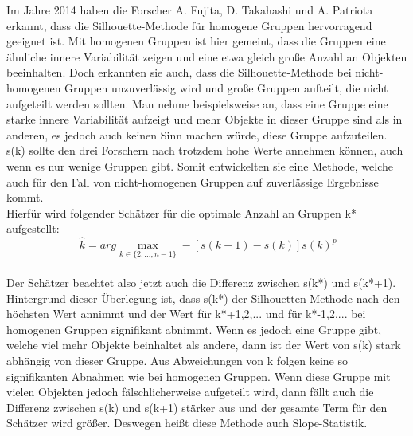 \documentclass[12pt,titlepage]{article}
\begin{document}
Im Jahre 2014 haben die Forscher A. Fujita, D. Takahashi und A. Patriota  \cite{FUJITA201427} erkannt, dass die Silhouette-Methode für homogene Gruppen hervorragend geeignet ist. Mit homogenen Gruppen ist hier gemeint, dass die Gruppen eine ähnliche innere Variabilität zeigen und eine etwa gleich große Anzahl an Objekten beeinhalten. Doch erkannten sie auch, dass die Silhouette-Methode bei nicht-homogenen Gruppen unzuverlässig wird und große Gruppen aufteilt, die nicht aufgeteilt werden sollten. Man nehme beispielsweise an, dass eine Gruppe eine starke innere Variabilität aufzeigt und mehr Objekte in dieser Gruppe sind als in anderen, es jedoch auch keinen Sinn machen würde, diese Gruppe aufzuteilen. s(k) sollte den drei Forschern nach trotzdem hohe Werte annehmen können, auch wenn es nur wenige Gruppen gibt. Somit entwickelten sie eine Methode, welche auch für den Fall von nicht-homogenen Gruppen auf zuverlässige Ergebnisse kommt.\\
Hierfür wird folgender Schätzer für die optimale Anzahl an Gruppen k* aufgestellt:
\begin{equation}
 \ \hat{k}=arg \max_{k\in \{ 2,...,n-1\} } -[s(k+1)-s(k)]s(k)^p
\end{equation} \\
Der Schätzer beachtet also jetzt auch die Differenz zwischen s(k*) und s(k*+1). Hintergrund dieser Überlegung ist, dass s(k*) der Silhouetten-Methode nach den höchsten Wert annimmt und der Wert für k*+1,2,... und für k*-1,2,... bei homogenen Gruppen signifikant abnimmt. Wenn es jedoch eine Gruppe gibt, welche viel mehr Objekte beinhaltet als andere, dann ist der Wert von s(k) stark abhängig von dieser Gruppe. Aus Abweichungen von k folgen keine so signifikanten Abnahmen wie bei homogenen Gruppen. Wenn diese Gruppe mit vielen Objekten jedoch fälschlicherweise aufgeteilt wird, dann fällt auch die Differenz zwischen s(k) und s(k+1) stärker aus und der gesamte Term für den Schätzer wird größer. Deswegen heißt diese Methode auch Slope-Statistik.\\

\newpage

\thispagestyle{empty}
  







 
\end{document}
